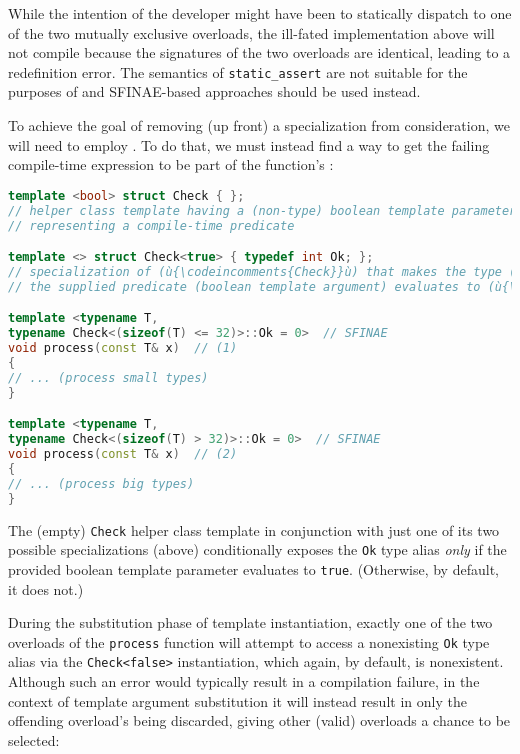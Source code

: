 \noindent While the intention of the developer might have been to statically
dispatch to one of the two mutually exclusive overloads, the ill-fated
implementation above will not compile because the signatures of the two
overloads are identical, leading to a redefinition error. The semantics
of \lstinline!static_assert! are not suitable for the purposes of
 and SFINAE-based approaches should be used instead.

To achieve the goal of removing (up
front) a specialization from consideration, we will need to employ
. To do that, we must instead find a way to get the
failing compile-time expression to be part of the function's
:

\begin{lstlisting}[language=C++]
template <bool> struct Check { };
// helper class template having a (non-type) boolean template parameter
// representing a compile-time predicate

template <> struct Check<true> { typedef int Ok; };
// specialization of (ù{\codeincomments{Check}}ù) that makes the type (ù{\codeincomments{Ok}}ù) manifest *only* if
// the supplied predicate (boolean template argument) evaluates to (ù{\codeincomments{true}}ù)

template <typename T,
typename Check<(sizeof(T) <= 32)>::Ok = 0>  // SFINAE
void process(const T& x)  // (1)
{
// ... (process small types)
}

template <typename T,
typename Check<(sizeof(T) > 32)>::Ok = 0>  // SFINAE
void process(const T& x)  // (2)
{
// ... (process big types)
}
\end{lstlisting}

\noindent The (empty) \lstinline!Check! helper class template in conjunction with
just one of its two possible specializations (above) conditionally
exposes the \lstinline!Ok! type alias \emph{only} if the provided boolean
template parameter evaluates to \lstinline!true!. (Otherwise, by default, it
does not.)

During the substitution phase of template instantiation,
exactly one of the two overloads of the \lstinline!process! function will
attempt to access a nonexisting \lstinline!Ok! type alias via the
\lstinline!Check<false>! instantiation, which again, by default, is
nonexistent. Although such an error would typically result in a
compilation failure, in the context of template argument substitution it
will instead result in only the offending overload's being discarded,
giving other (valid) overloads a chance to be selected:

